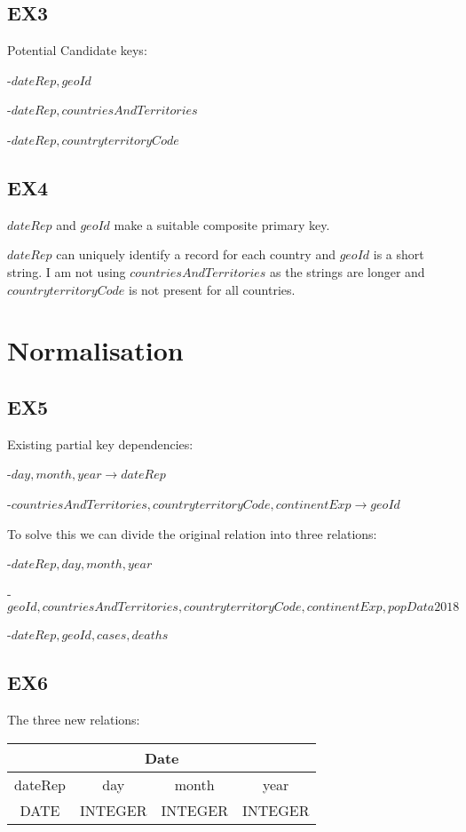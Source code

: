 \documentclass[12pt]{article}
\begin{document}
\subsection*{EX3}

Potential Candidate keys:

-$dateRep, geoId$

-$dateRep, countriesAndTerritories$

-$dateRep, countryterritoryCode$

\subsection*{EX4}

$dateRep$ and $geoId$ make a suitable composite primary key.

$dateRep$ can uniquely identify a record for each country and $geoId$ is a short string. I am not using $countriesAndTerritories$ as the strings are longer and $countryterritoryCode$ is not present for all countries.

\section*{Normalisation}

\subsection*{EX5}

Existing partial key dependencies:

-$day, month, year \rightarrow dateRep$

-$countriesAndTerritories, countryterritoryCode, continentExp \rightarrow geoId$

\vspace{1em}

To solve this we can divide the original relation into three relations:

-$dateRep, day, month, year$

-$geoId, countriesAndTerritories, countryterritoryCode, continentExp, popData2018$

-$dateRep, geoId, cases, deaths$

\subsection*{EX6}

The three new relations:

\begin{center}
\begin{tabular}{ |c|c|c|c| } 
 \hline
 \multicolumn{4}{|c|}{Date} \\
 \hline
 dateRep & day & month & year \\
 \hline
 DATE & INTEGER & INTEGER & INTEGER \\
 \hline
\end{tabular}
\end{center}
\end{document}
